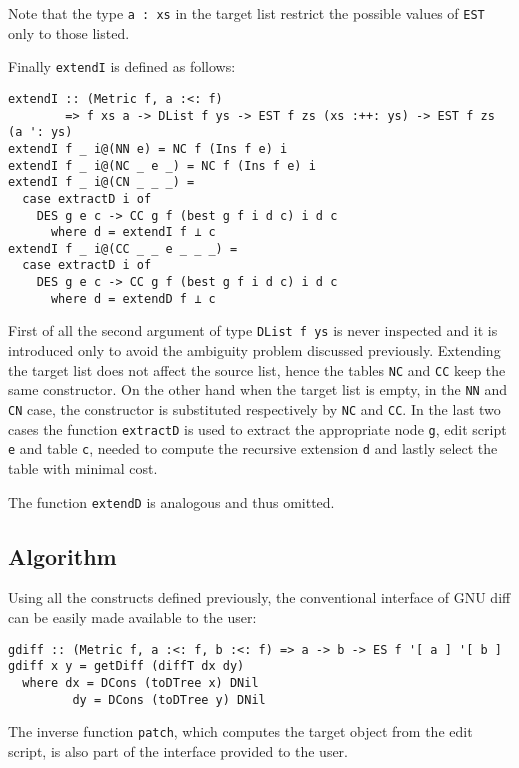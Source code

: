 \documentclass[../Thesis.tex]{subfiles}
\begin{document}
	Note that the type \texttt{a : xs} in the target list restrict the possible
	values of \texttt{EST} only to those listed.

	Finally \texttt{extendI} is defined as follows:
	
\begin{verbatim}	
extendI :: (Metric f, a :<: f)
        => f xs a -> DList f ys -> EST f zs (xs :++: ys) -> EST f zs (a ': ys)
extendI f _ i@(NN e) = NC f (Ins f e) i
extendI f _ i@(NC _ e _) = NC f (Ins f e) i
extendI f _ i@(CN _ _ _) =
  case extractD i of
    DES g e c -> CC g f (best g f i d c) i d c
      where d = extendI f ⊥ c
extendI f _ i@(CC _ _ e _ _ _) =
  case extractD i of
    DES g e c -> CC g f (best g f i d c) i d c
      where d = extendD f ⊥ c
\end{verbatim}

	First of all the second argument of type \texttt{DList f ys} is never inspected
	and it is introduced only to avoid the ambiguity problem discussed 
	previously.
	Extending the target list does not affect the source list, hence
	the tables \texttt{NC} and \texttt{CC} keep the same constructor.
	On the other hand when the target list is empty, in the \texttt{NN} and
	\texttt{CN} case, the constructor is substituted respectively by
	\texttt{NC} and \texttt{CC}.
	In the last two cases the function \texttt{extractD} is used to extract
	the appropriate node \texttt{g}, edit script \texttt{e} and table
	\texttt{c}, needed to compute the recursive extension \texttt{d}
	and lastly select the table with minimal cost.
		
	The function \texttt{extendD} is analogous and thus omitted.

	\subsection{Algorithm}
	\label{subsec:HaskellAlgo}
	Using all the constructs defined previously, the conventional
	interface of GNU diff can be easily made available to the
	user:

\begin{verbatim}
gdiff :: (Metric f, a :<: f, b :<: f) => a -> b -> ES f '[ a ] '[ b ]
gdiff x y = getDiff (diffT dx dy)
  where dx = DCons (toDTree x) DNil
         dy = DCons (toDTree y) DNil
\end{verbatim}
	
	The inverse function \texttt{patch}, which computes the target
	object from the edit script, is also part of the interface
	provided to the user.
\end{document}
